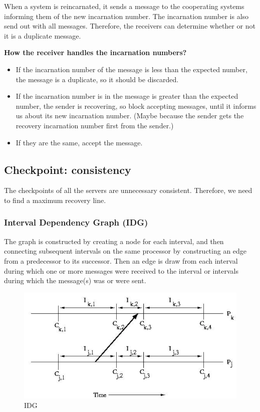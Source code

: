 When a system is reincarnated, it sends a message to the cooperating systems informing them of the new incarnation number. The incarnation number is also send out with all messages. Therefore, the receivers can determine whether or not it is a duplicate message.

\textbf{How the receiver handles the incarnation numbers?}
\begin{itemize}
    \item If the incarnation number of the message is less than the expected number, the message is a duplicate, so it should be discarded.
    \item If the incarnation number is in the message is greater than the expected number, the sender is recovering, so block accepting messages, until it informs us about its new incarnation number. (Maybe because the sender gets the recovery incarnation number first from the sender.)
    \item If they are the same, accept the message.
\end{itemize}

\subsection{Checkpoint: consistency}
The checkpoints of all the servers are unnecessary consistent. Therefore, we need to find a maximum recovery line.

\subsubsection{Interval Dependency Graph (IDG)}
The graph is constructed by creating a node for each interval, and then connecting subsequent intervals on the same processor by constructing an edge from a predecessor to its successor. Then an edge is draw from each interval during which one or more messages were received to the interval or intervals during which the message(s) was or were sent.
\begin{figure}
\centering
\includegraphics[width=\textwidth]{img/ch03-idg.png}
\caption{IDG}
\label{fig:ch03-idg}
\end{figure}

